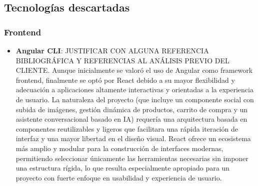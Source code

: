 \subsection{Tecnologías descartadas}
\subsubsection*{Frontend}
\begin{itemize}
    \item \textbf{Angular CLI}: JUSTIFICAR CON ALGUNA REFERENCIA BIBLIOGRÁFICA Y REFERENCIAS AL ANÁLISIS PREVIO DEL CLIENTE. Aunque inicialmente se valoró el uso de Angular como framework frontend, finalmente se optó por React debido a su mayor flexibilidad y adecuación a aplicaciones altamente interactivas y orientadas a la experiencia de usuario. La naturaleza del proyecto (que incluye un componente social con subida de imágenes, gestión dinámica de productos, carrito de compra y un asistente conversacional basado en IA) requería una arquitectura basada en componentes reutilizables y ligeros que facilitara una rápida iteración de interfaz y una mayor libertad en el diseño visual. React ofrece un ecosistema más amplio y modular para la construcción de interfaces modernas, permitiendo seleccionar únicamente las herramientas necesarias sin imponer una estructura rígida, lo que resulta especialmente apropiado para un proyecto con fuerte enfoque en usabilidad y experiencia de usuario.
\end{itemize}